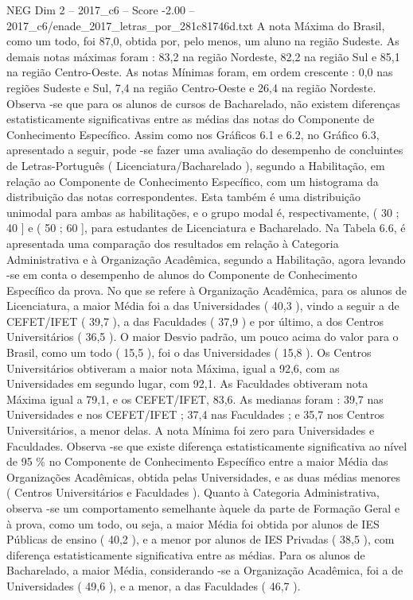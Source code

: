 \begin{textsample}{NEG Dim 2 – 2017\_c6 – Score -2.00 – 2017\_c6/enade\_2017\_letras\_por\_281c81746d.txt}
A nota Máxima do Brasil, como um todo, foi 87,0, obtida por, pelo menos, um aluno na região Sudeste.
As demais notas máximas foram : 83,2 na região Nordeste, 82,2 na região Sul e 85,1 na região Centro-Oeste.
As notas Mínimas foram, em ordem crescente : 0,0 nas regiões Sudeste e Sul, 7,4 na região Centro-Oeste e 26,4 na região Nordeste.
Observa -se que para os alunos de cursos de Bacharelado, não existem diferenças estatisticamente significativas entre as médias das notas do Componente de Conhecimento Específico.
Assim como nos Gráficos 6.1 e 6.2, no Gráfico 6.3, apresentado a seguir, pode -se fazer uma avaliação do desempenho de concluintes de Letras-Português ( Licenciatura/Bacharelado ), segundo a Habilitação, em relação ao Componente de Conhecimento Específico, com um histograma da distribuição das notas correspondentes.
Esta também é uma distribuição unimodal para ambas as habilitações, e o grupo modal é, respectivamente, ( 30 ; 40 ] e ( 50 ; 60 ], para estudantes de Licenciatura e Bacharelado.
Na Tabela 6.6, é apresentada uma comparação dos resultados em relação à Categoria Administrativa e à Organização Acadêmica, segundo a Habilitação, agora levando -se em conta o desempenho de alunos do Componente de Conhecimento Específico da prova.
No que se refere à Organização Acadêmica, para os alunos de Licenciatura, a maior Média foi a das Universidades ( 40,3 ), vindo a seguir a de CEFET/IFET ( 39,7 ), a das Faculdades ( 37,9 ) e por último, a dos Centros Universitários ( 36,5 ).
O maior Desvio padrão, um pouco acima do valor para o Brasil, como um todo ( 15,5 ), foi o das Universidades ( 15,8 ).
Os Centros Universitários obtiveram a maior nota Máxima, igual a 92,6, com as Universidades em segundo lugar, com 92,1.
As Faculdades obtiveram nota Máxima igual a 79,1, e os CEFET/IFET, 83,6.
As medianas foram : 39,7 nas Universidades e nos CEFET/IFET ; 37,4 nas Faculdades ; e 35,7 nos Centros Universitários, a menor delas.
A nota Mínima foi zero para Universidades e Faculdades.
Observa -se que existe diferença estatisticamente significativa ao nível de 95 \% no Componente de Conhecimento Específico entre a maior Média das Organizações Acadêmicas, obtida pelas Universidades, e as duas médias menores ( Centros Universitários e Faculdades ).
Quanto à Categoria Administrativa, observa -se um comportamento semelhante àquele da parte de Formação Geral e à prova, como um todo, ou seja, a maior Média foi obtida por alunos de IES Públicas de ensino ( 40,2 ), e a menor por alunos de IES Privadas ( 38,5 ), com diferença estatisticamente significativa entre as médias.
Para os alunos de Bacharelado, a maior Média, considerando -se a Organização Acadêmica, foi a de Universidades ( 49,6 ), e a menor, a das Faculdades ( 46,7 ).

\end{textsample}
